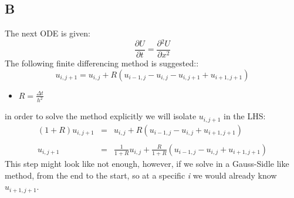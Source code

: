 \documentclass[11pt, a4paper]{article}
\newcommand{\parder}[2]{\frac{\partial {#1}}{\partial {#2}}}
\begin{document}
\subsection{B}
The next ODE is given:
\begin{equation}
    \parder{U}{t}=\parder{^2U}{x^2}
\end{equation}
The following finite differencing method is suggested::
\begin{equation}
    u_{i,j+1}=u_{i,j}+R\left(u_{i-1,j}-u_{i,j}-u_{i,j+1}+u_{i+1,j+1}\right)
\end{equation}
\begin{itemize}
    \item $\displaystyle R=\frac{\Delta t}{h^2}$
\end{itemize}
in order to solve the method explicitly we will isolate $u_{i,j+1}$ in the LHS:
\begin{equation}
    \begin{array}{rcl}
        \left(1+R\right)u_{i,j+1} & = & u_{i,j}+R\left(u_{i-1,j}-u_{i,j}+u_{i+1,j+1}\right) \\\\
        \displaystyle u_{i,j+1} & = & \displaystyle \frac{1}{1+R}u_{i,j}+\frac{R}{1+R}\left(u_{i-1,j}-u_{i,j}+u_{i+1,j+1}\right)
    \end{array}
\end{equation}
This step might look like not enough, however, if we solve in a Gauss-Sidle like method, from the end to the start, so at a specific \emph{i} we would already know $u_{i+1,j+1}$.
\end{document}
